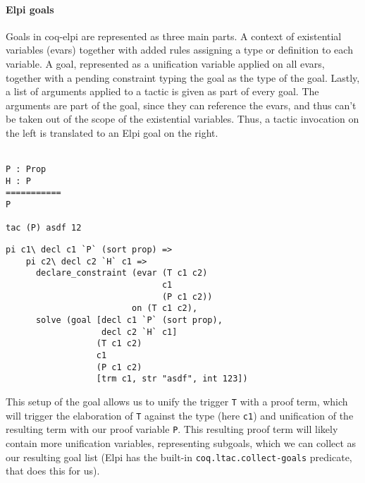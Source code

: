 \documentclass[thesis.tex]{subfiles}
\begin{document}
{{\paragraph*{Elpi goals}
Goals in coq-elpi are represented as three main parts. A context of existential variables (evars) together with added rules assigning a type or definition to each variable. A goal, represented as a unification variable applied on all evars, together with a pending constraint typing the goal as the type of the goal. Lastly, a list of arguments applied to a tactic is given as part of every goal. The arguments are part of the goal, since they can reference the evars, and thus can't be taken out of the scope of the existential variables. Thus, a tactic invocation on the left is translated to an Elpi goal on the right.
\\\\
\begin{minipage}[t]{0.2\linewidth}
  \begin{verbatim}
P : Prop
H : P
===========
P

tac (P) asdf 12
\end{verbatim}
\end{minipage}
\begin{minipage}[t]{0.45\linewidth}
  \begin{verbatim}
pi c1\ decl c1 `P` (sort prop) =>
    pi c2\ decl c2 `H` c1 =>
      declare_constraint (evar (T c1 c2) 
                               c1
                               (P c1 c2)) 
                         on (T c1 c2),
      solve (goal [decl c1 `P` (sort prop), 
                   decl c2 `H` c1] 
                  (T c1 c2)
                  c1 
                  (P c1 c2)
                  [trm c1, str "asdf", int 123])
\end{verbatim}
  \vspace{.1cm}
\end{minipage}

This setup of the goal allows us to unify the trigger \texttt{T} with a proof term, which will trigger the elaboration of \texttt{T} against the type (here \texttt{c1}) and unification of the resulting term with our proof variable \texttt{P}. This resulting proof term will likely contain more unification variables, representing subgoals, which we can collect as our resulting goal list (Elpi has the built-in \texttt{coq.ltac.collect-goals} predicate, that does this for us).

}}
\end{document}
